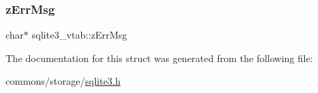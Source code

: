 \mbox{\label{structsqlite3__vtab_afc50eadfdd7cef876633d460deba48d6}} 
\subsubsection{\texorpdfstring{zErrMsg}{zErrMsg}}
{\footnotesize\ttfamily char$\ast$ sqlite3\+\_\+vtab\+::z\+Err\+Msg}



The documentation for this struct was generated from the following file\+:\begin{DoxyCompactItemize}
\item 
commons/storage/\mbox{\hyperlink{sqlite3_8h}{sqlite3.\+h}}\end{DoxyCompactItemize}
